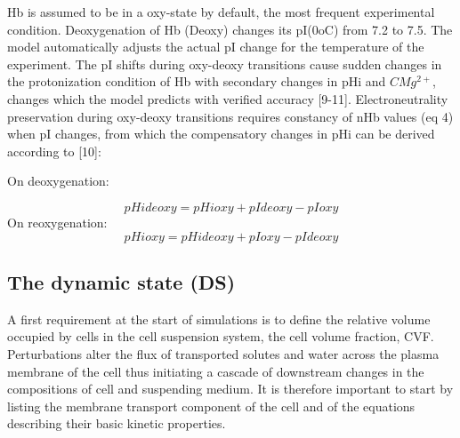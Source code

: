 \documentclass[a4paper]{article}
\begin{document}
Hb is assumed to be in a oxy-state by default, the most frequent experimental condition. Deoxygenation of Hb (Deoxy) changes its pI(0oC) from 7.2 to 7.5.  The model automatically adjusts the actual pI change for the temperature of the experiment.  The pI shifts during oxy-deoxy transitions cause sudden changes in the protonization condition of Hb with secondary changes in pHi and $CMg^{2+}$, changes which the model predicts with verified accuracy [9-11].  Electroneutrality preservation during oxy-deoxy transitions requires constancy of nHb values (eq 4) when pI changes, from which the compensatory changes in pHi can be derived according to [10]: 

On deoxygenation:

\setcounter{equation}{0}
\renewcommand{\theequation}{4.\alph{equation}}
\begin{equation}
pHideoxy = pHioxy + pIdeoxy - pIoxy 
\end{equation}
On reoxygenation:
\begin{equation}
pHioxy = pHideoxy + pIoxy - pIdeoxy 
\end{equation}

\subsection{The dynamic state (DS)}

\setcounter{equation}{9}
\renewcommand{\theequation}{\arabic{equation}}

A first requirement at the start of simulations is to define the relative volume occupied by cells in the cell suspension system, the cell volume fraction, CVF.  Perturbations alter the flux of transported solutes and water across the plasma membrane of the cell thus initiating a cascade of downstream changes in the compositions of cell and suspending medium.  It is therefore important to start by listing the membrane transport component of the cell and of the equations describing their basic kinetic properties.  
\end{document}
